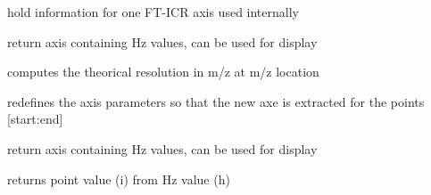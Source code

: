 \documentclass[letterpaper,10pt,openany,oneside]{sphinxmanual}
\begin{document}
\begin{fulllineitems}
\label{rst/code:FTICR.FTICRAxis}
hold information for one FT-ICR axis
used internally

\begin{fulllineitems}
\label{rst/code:FTICR.FTICRAxis.Hz_axis}
return axis containing Hz values, can be used for display

\end{fulllineitems}


\begin{fulllineitems}
\label{rst/code:FTICR.FTICRAxis.deltamz}
computes the theorical resolution in m/z at m/z location

\end{fulllineitems}


\begin{fulllineitems}
\label{rst/code:FTICR.FTICRAxis.extract}
redefines the axis parameters so that the new axe is extracted for the points {[}start:end{]}

\end{fulllineitems}


\begin{fulllineitems}
\label{rst/code:FTICR.FTICRAxis.freq_axis}
return axis containing Hz values, can be used for display

\end{fulllineitems}


\begin{fulllineitems}
\label{rst/code:FTICR.FTICRAxis.htoi}
returns point value (i) from Hz value (h)


\end{fulllineitems}
\end{fulllineitems}
\end{document}
